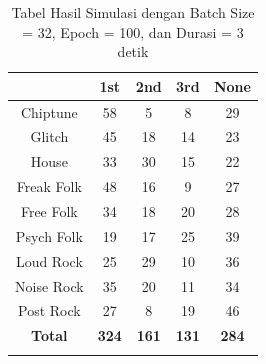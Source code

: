 \begin{longtable}[c]{|c|c|c|c|c|}
	\hline
	\textbf{}      & \textbf{1st} & \textbf{2nd} & \textbf{3rd} & \textbf{None} \\ \hline
	\endfirsthead
	\endhead
	Chiptune       & 58           & 5            & 8            & 29            \\ \hline
	Glitch         & 45           & 18           & 14           & 23            \\ \hline
	House          & 33           & 30           & 15           & 22            \\ \hline
	Freak Folk     & 48           & 16           & 9            & 27            \\ \hline
	Free Folk      & 34           & 18           & 20           & 28            \\ \hline
	Psych Folk     & 19           & 17           & 25           & 39            \\ \hline
	Loud Rock      & 25           & 29           & 10           & 36            \\ \hline
	Noise Rock     & 35           & 20           & 11           & 34            \\ \hline
	Post Rock      & 27           & 8            & 19           & 46            \\ \hline
	\textbf{Total} & \textbf{324} & \textbf{161} & \textbf{131} & \textbf{284}  \\ \hline
	\caption{Tabel Hasil Simulasi dengan Batch Size = 32, Epoch = 100, dan Durasi = 3 detik}
	\label{tab:my-table}\\
\end{longtable}

